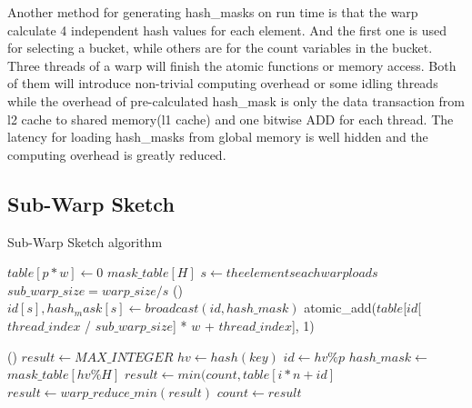 \documentclass[conference]{IEEEtran}
\begin{document}
Another method for generating hash\_masks on run time is that the warp calculate 4 independent hash values for each element. And the first one is used for selecting a bucket, while others are for the count variables in the bucket. Three threads of a warp will finish the atomic functions or memory access. Both of them will introduce non-trivial computing overhead or some idling threads while the overhead of pre-calculated hash\_mask is only the data transaction from l2 cache to shared memory(l1 cache) and one bitwise ADD for each thread. The latency for loading hash\_masks from global memory is well hidden and the computing overhead is greatly reduced. 

\subsection{Sub-Warp Sketch}

\begin{algorithm}
    \DontPrintSemicolon
    \caption{Sub-Warp Sketch algorithm}
    $table[p * w] \longleftarrow 0$\;
    $mask\_table[H]$\;
    $s \longleftarrow the elements each warp loads$\;
    $sub\_warp\_size = warp\_size / s $\;
\Fn(){}
{
    {
            $id[s], hash_mask[s] \leftarrow broadcast(id, hash\_mask)$\;
            {
                {
                    atomic\_add($table$[$id$[$thread\_index$ / $sub\_warp\_size$] * $w$ + $thread\_index$], 1)
                }
            }
    }
}

\Fn(){}
{%
    {
        $result \leftarrow MAX\_INTEGER$\;
            $hv \leftarrow hash(key)$\;
            $id \leftarrow hv \% p$
            $hash\_mask \leftarrow$ $mask\_table[hv \% H]$
            {
                {
                    $result \leftarrow min(count, table[i * n + id]$
                }
            }
        $result \leftarrow warp\_reduce\_min(result)$\;
        {
            $count \leftarrow result$
        }
    }
}

\end{algorithm}
\end{document}
